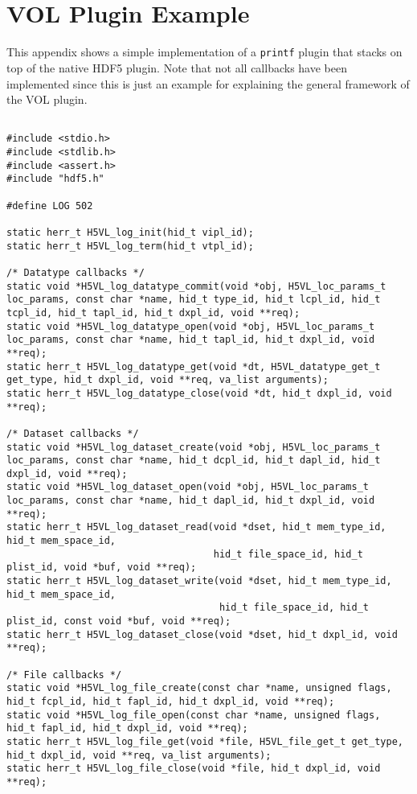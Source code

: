 \appendix
\section{\\VOL Plugin Example}
\label{sec:A}

This appendix shows a simple implementation of a {\tt printf} plugin that stacks on top of the native HDF5 plugin. Note that not all callbacks have been implemented since this is just an example for explaining the general framework of the VOL plugin.

\begin{lstlisting}

#include <stdio.h>
#include <stdlib.h>
#include <assert.h>
#include "hdf5.h"

#define LOG 502

static herr_t H5VL_log_init(hid_t vipl_id);
static herr_t H5VL_log_term(hid_t vtpl_id);

/* Datatype callbacks */
static void *H5VL_log_datatype_commit(void *obj, H5VL_loc_params_t loc_params, const char *name, hid_t type_id, hid_t lcpl_id, hid_t tcpl_id, hid_t tapl_id, hid_t dxpl_id, void **req);
static void *H5VL_log_datatype_open(void *obj, H5VL_loc_params_t loc_params, const char *name, hid_t tapl_id, hid_t dxpl_id, void **req);
static herr_t H5VL_log_datatype_get(void *dt, H5VL_datatype_get_t get_type, hid_t dxpl_id, void **req, va_list arguments);
static herr_t H5VL_log_datatype_close(void *dt, hid_t dxpl_id, void **req);

/* Dataset callbacks */
static void *H5VL_log_dataset_create(void *obj, H5VL_loc_params_t loc_params, const char *name, hid_t dcpl_id, hid_t dapl_id, hid_t dxpl_id, void **req);
static void *H5VL_log_dataset_open(void *obj, H5VL_loc_params_t loc_params, const char *name, hid_t dapl_id, hid_t dxpl_id, void **req);
static herr_t H5VL_log_dataset_read(void *dset, hid_t mem_type_id, hid_t mem_space_id,
                                    hid_t file_space_id, hid_t plist_id, void *buf, void **req);
static herr_t H5VL_log_dataset_write(void *dset, hid_t mem_type_id, hid_t mem_space_id,
                                     hid_t file_space_id, hid_t plist_id, const void *buf, void **req);
static herr_t H5VL_log_dataset_close(void *dset, hid_t dxpl_id, void **req);

/* File callbacks */
static void *H5VL_log_file_create(const char *name, unsigned flags, hid_t fcpl_id, hid_t fapl_id, hid_t dxpl_id, void **req);
static void *H5VL_log_file_open(const char *name, unsigned flags, hid_t fapl_id, hid_t dxpl_id, void **req);
static herr_t H5VL_log_file_get(void *file, H5VL_file_get_t get_type, hid_t dxpl_id, void **req, va_list arguments);
static herr_t H5VL_log_file_close(void *file, hid_t dxpl_id, void **req);


\end{lstlisting}
